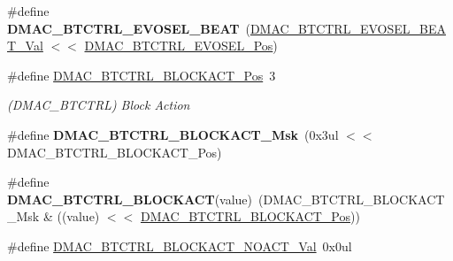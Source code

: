\begin{DoxyCompactItemize}
\item 
\hypertarget{group___s_a_m_l21___d_m_a_c_gacb841e5a57aef6a94baf31a6eb792706}{}\#define {\bfseries D\+M\+A\+C\+\_\+\+B\+T\+C\+T\+R\+L\+\_\+\+E\+V\+O\+S\+E\+L\+\_\+\+B\+E\+A\+T}~(\hyperlink{group___s_a_m_l21___d_m_a_c_ga4b99d2ad5c89d62800f6f6d0c5fa0c3a}{D\+M\+A\+C\+\_\+\+B\+T\+C\+T\+R\+L\+\_\+\+E\+V\+O\+S\+E\+L\+\_\+\+B\+E\+A\+T\+\_\+\+Val}   $<$$<$ \hyperlink{group___s_a_m_l21___d_m_a_c_ga1f5b7dc4dab8086525a4bcb012d380b6}{D\+M\+A\+C\+\_\+\+B\+T\+C\+T\+R\+L\+\_\+\+E\+V\+O\+S\+E\+L\+\_\+\+Pos})\label{group___s_a_m_l21___d_m_a_c_gacb841e5a57aef6a94baf31a6eb792706}

\item 
\hypertarget{group___s_a_m_l21___d_m_a_c_ga65ebce978928207ff9f7ae48e8a1c602}{}\#define \hyperlink{group___s_a_m_l21___d_m_a_c_ga65ebce978928207ff9f7ae48e8a1c602}{D\+M\+A\+C\+\_\+\+B\+T\+C\+T\+R\+L\+\_\+\+B\+L\+O\+C\+K\+A\+C\+T\+\_\+\+Pos}~3\label{group___s_a_m_l21___d_m_a_c_ga65ebce978928207ff9f7ae48e8a1c602}

\begin{DoxyCompactList}\small\item\em (D\+M\+A\+C\+\_\+\+B\+T\+C\+T\+R\+L) Block Action \end{DoxyCompactList}\item 
\hypertarget{group___s_a_m_l21___d_m_a_c_ga60c25bf86f42cb952c6a6fa578bd3928}{}\#define {\bfseries D\+M\+A\+C\+\_\+\+B\+T\+C\+T\+R\+L\+\_\+\+B\+L\+O\+C\+K\+A\+C\+T\+\_\+\+Msk}~(0x3ul $<$$<$ D\+M\+A\+C\+\_\+\+B\+T\+C\+T\+R\+L\+\_\+\+B\+L\+O\+C\+K\+A\+C\+T\+\_\+\+Pos)\label{group___s_a_m_l21___d_m_a_c_ga60c25bf86f42cb952c6a6fa578bd3928}

\item 
\hypertarget{group___s_a_m_l21___d_m_a_c_ga6db2acd6a57e8bf28ba1202f830d2586}{}\#define {\bfseries D\+M\+A\+C\+\_\+\+B\+T\+C\+T\+R\+L\+\_\+\+B\+L\+O\+C\+K\+A\+C\+T}(value)~(D\+M\+A\+C\+\_\+\+B\+T\+C\+T\+R\+L\+\_\+\+B\+L\+O\+C\+K\+A\+C\+T\+\_\+\+Msk \& ((value) $<$$<$ \hyperlink{group___s_a_m_l21___d_m_a_c_ga65ebce978928207ff9f7ae48e8a1c602}{D\+M\+A\+C\+\_\+\+B\+T\+C\+T\+R\+L\+\_\+\+B\+L\+O\+C\+K\+A\+C\+T\+\_\+\+Pos}))\label{group___s_a_m_l21___d_m_a_c_ga6db2acd6a57e8bf28ba1202f830d2586}

\item 
\hypertarget{group___s_a_m_l21___d_m_a_c_gae3898b14fd517579b8b018b2ba176c4d}{}\#define \hyperlink{group___s_a_m_l21___d_m_a_c_gae3898b14fd517579b8b018b2ba176c4d}{D\+M\+A\+C\+\_\+\+B\+T\+C\+T\+R\+L\+\_\+\+B\+L\+O\+C\+K\+A\+C\+T\+\_\+\+N\+O\+A\+C\+T\+\_\+\+Val}~0x0ul\label{group___s_a_m_l21___d_m_a_c_gae3898b14fd517579b8b018b2ba176c4d}


\end{DoxyCompactItemize}
